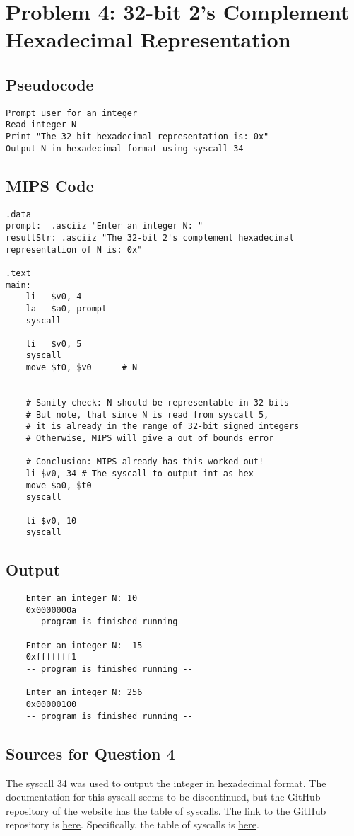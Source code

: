 \documentclass[a4paper]{article}
\begin{document}
\newpage
\section*{Problem 4: 32-bit 2’s Complement Hexadecimal Representation}
\subsection*{Pseudocode}
\begin{verbatim}
Prompt user for an integer
Read integer N
Print "The 32-bit hexadecimal representation is: 0x"
Output N in hexadecimal format using syscall 34
\end{verbatim}

\subsection*{MIPS Code}
\begin{verbatim}
.data
prompt:  .asciiz "Enter an integer N: "
resultStr: .asciiz "The 32-bit 2's complement hexadecimal representation of N is: 0x"

.text
main:
    li   $v0, 4
    la   $a0, prompt
    syscall

    li   $v0, 5
    syscall
    move $t0, $v0      # N
    
    
    # Sanity check: N should be representable in 32 bits
    # But note, that since N is read from syscall 5, 
    # it is already in the range of 32-bit signed integers
    # Otherwise, MIPS will give a out of bounds error

    # Conclusion: MIPS already has this worked out!
    li $v0, 34 # The syscall to output int as hex
    move $a0, $t0
    syscall

    li $v0, 10
    syscall
\end{verbatim}

\subsection*{Output}
\begin{verbatim}
    Enter an integer N: 10
    0x0000000a
    -- program is finished running --
    
    Enter an integer N: -15
    0xfffffff1
    -- program is finished running --
    
    Enter an integer N: 256
    0x00000100
    -- program is finished running --
\end{verbatim}


\subsection*{Sources for Question 4}
The syscall 34 was used to output the integer in hexadecimal format. The documentation for this syscall seems to be discontinued, but the GitHub repository of the website has the table of syscalls. The link to the GitHub repository is \href{https://github.com/saagarjha/MARS}{here}. Specifically, the table of syscalls is \href{https://github.com/saagarjha/MARS/blob/master/help/SyscallHelp.html}{here}.
\end{document}
